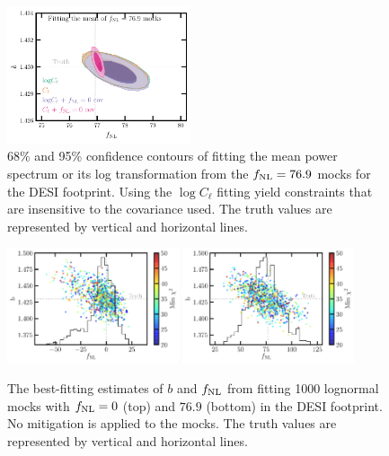 \begin{figure}
    \centering
    \includegraphics[width=0.48\textwidth]{figures/mcmc_po100.pdf} 
    \caption{68\% and 95\% confidence contours of fitting the mean power spectrum or its log transformation from the $f_{\rm NL}=76.9$ mocks for the DESI footprint. Using the $\log C_{\ell}$ fitting yield constraints that are insensitive to the covariance used. The truth values are represented by vertical and horizontal lines.}\label{fig:mcmc_mocks100}
\end{figure}

\begin{figure}
    \centering
    \includegraphics[width=0.45\textwidth]{figures/bestfit_zero.pdf} 
    \includegraphics[width=0.45\textwidth]{figures/bestfit_po100.pdf}         
    \caption{The best-fitting estimates of $b$ and $f_{\rm NL}$ from fitting 1000 lognormal mocks with $f_{\rm NL}=0$ (top) and $76.9$ (bottom) in the DESI footprint. No mitigation is applied to the mocks. The truth values are represented by vertical and horizontal lines.}\label{fig:bestfit_mocks}
\end{figure}

